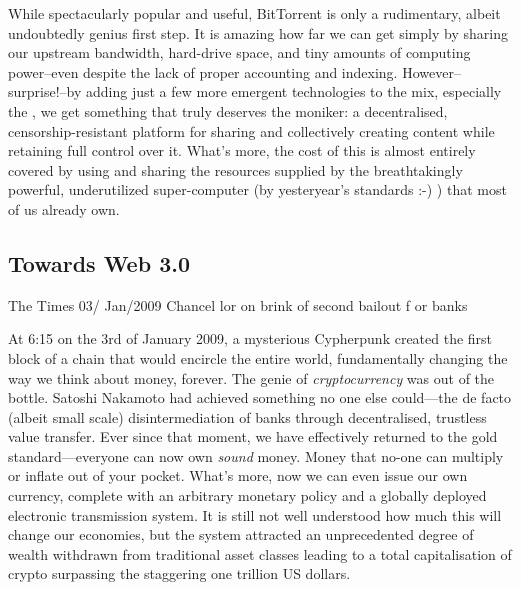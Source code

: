 While spectacularly popular and useful, BitTorrent is only a rudimentary, albeit undoubtedly genius first step. It is amazing how far we can get simply by sharing our upstream bandwidth, hard-drive space, and tiny amounts of computing power–even despite the lack of proper accounting and indexing. However–surprise!–by adding just a few more emergent technologies to the mix, especially the , we get something that truly deserves the  moniker: a decentralised, censorship-resistant platform for sharing and collectively creating content while retaining full control over it. What's more, the cost of this is almost entirely covered by using and sharing the resources supplied by the breathtakingly powerful, underutilized super-computer (by yesteryear's standards :-) ) that most of us already own.

\subsection{Towards Web 3.0 \statusgreen}\label{sec:towards-web3}


\begin{centerverbatim}
The Times 03/
Jan/2009 Chancel
lor on brink of 
second bailout f
or banks
\end{centerverbatim}

At 6:15 on the 3rd of January 2009, a mysterious Cypherpunk created the first block of a chain that would encircle the entire world, fundamentally changing the way we think about money, forever. The genie of \emph{cryptocurrency} was out of the bottle. Satoshi Nakamoto had achieved something no one else could—the de facto (albeit small scale) disintermediation of banks through decentralised, trustless value transfer. Ever since that moment, we have effectively returned to the gold standard—everyone can now own \emph{sound} money. Money that no-one can multiply or inflate out of your pocket. What's more, now we can even issue our own currency, complete with an arbitrary monetary policy and a globally deployed electronic transmission system. It is still not well understood how much this will change our economies, but the system attracted an unprecedented degree of wealth withdrawn from traditional asset classes leading to a total capitalisation of crypto surpassing the staggering one trillion US dollars.

